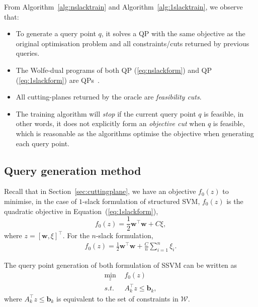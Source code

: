 From Algorithm~\ref{alg:nslacktrain} and Algorithm~\ref{alg:1slacktrain}, we observe that:
\begin{itemize}
\item To generate a query point $q$, it solves a QP with the same objective as the original optimisation problem and
      all constraints/cuts returned by previous queries. 
\item The Wolfe-dual programs of both QP (\ref{eq:nslackform}) and QP (\ref{eq:1slackform}) are QPs~\cite{tsochantaridis2005large,joachims2009cutting}.
\item All cutting-planes returned by the oracle are \emph{feasibility cuts}.
\item The training algorithm will \emph{stop} if the current query point $q$ is feasible, 
      in other words, it does not explicitly form an \emph{objective cut} when $q$ is feasible,
      which is reasonable as the algorithms optimise the objective when generating each query point.
\end{itemize}



\subsection{Query generation method}
\label{sec:ssvm_query}

Recall that in Section~\ref{sec:cuttingplane}, we have an objective $f_0(z)$ to minimise, in the case of $1$-slack formulation of structured SVM,
$f_0(z)$ is the quadratic objective in Equation~(\ref{eq:1slackform}), 
\begin{equation}
\label{eq:optobj}
f_0(z) = \frac{1}{2} \mathbf{w}^\top \mathbf{w} + C\xi,
\end{equation}
where $z = [\mathbf{w}, \xi]^\top$.
For the $n$-slack formulation, 
\begin{equation}
\begin{aligned}
f_0(z) = \frac{1}{2} \mathbf{w}^\top \mathbf{w} + \frac{C}{n} \sum_{i=1}^n \xi_i.
\end{aligned}
\end{equation}

The query point generation of both formulation of SSVM can be written as
\begin{equation*}
\begin{aligned}
\min_{z} ~& f_0(z) \\
s.t.~~ ~& A_k^\top z \le \mathbf{b}_k,
\end{aligned}
\end{equation*}
where $A_k^\top z \le \mathbf{b}_k$ is equivalent to the set of constraints in $\mathcal{W}$.



